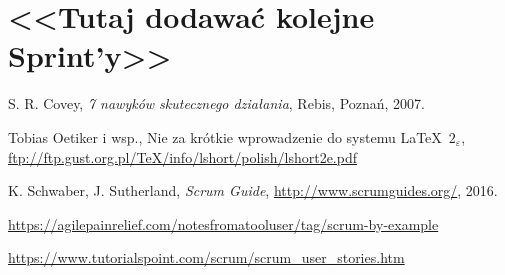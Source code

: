 \documentclass[a4paper]{article}
\begin{document}
\section*{<<Tutaj dodawać kolejne Sprint'y>>}


\begin{thebibliography}{9}

 S. R. Covey, {\em 7 nawyków skutecznego działania}, Rebis, Poznań, 2007.

 Tobias Oetiker i wsp., Nie za krótkie wprowadzenie do systemu \LaTeX  \ $2_\varepsilon$, \url{ftp://ftp.gust.org.pl/TeX/info/lshort/polish/lshort2e.pdf}

 K. Schwaber, J. Sutherland, {\em Scrum Guide}, \url{http://www.scrumguides.org/}, 2016.

 \url{https://agilepainrelief.com/notesfromatooluser/tag/scrum-by-example}

 \url{https://www.tutorialspoint.com/scrum/scrum_user_stories.htm}

\end{thebibliography}
\end{document}
